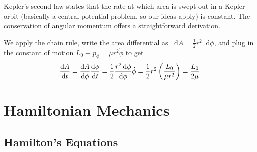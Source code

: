 \documentclass[11pt, a4paper]{article}
\newcommand{\diff}{\mathop{}\!\mathrm{d}} %
\begin{document}
Kepler's second law states that the rate at which area is swept out in a Kepler orbit (basically a central potential problem, so our ideas apply) is constant. The conservation of angular momentum offers a straightforward derivation. 

We apply the chain rule, write the area differential as $ \diff A = \frac{1}{2} r^2 \diff \phi $, and plug in the constant of motion $ L_0 \equiv p_{\phi} = \mu r^2 \dot{\phi} $ to get
\begin{align*}
	\dv{A}{t} = \dv{A}{\phi} \dv{\phi}{t} = \frac{1}{2} \frac{r^2 \diff \phi}{\diff \phi} \dot{\phi} = \frac{1}{2} r^2 \left(\frac{L_0}{\mu r^2}\right) = \frac{L_0}{2\mu} 
\end{align*}
\fi

\newpage

\section{Hamiltonian Mechanics} \label{sec:hamilton}

\subsection{Hamilton's Equations}
\end{document}
